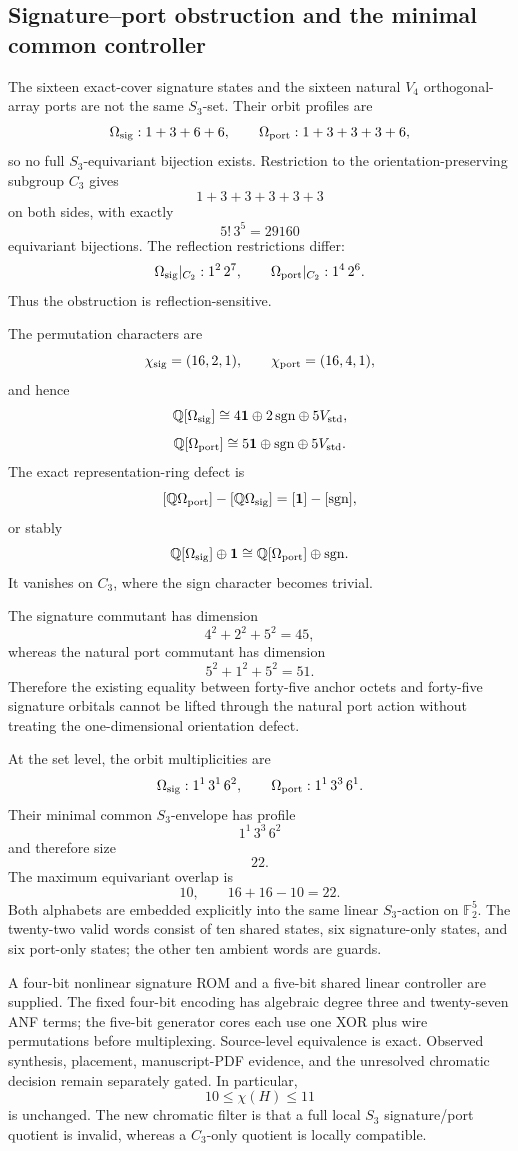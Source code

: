 \subsection{Signature--port obstruction and the minimal common controller}
The sixteen exact-cover signature states and the sixteen natural \(V_4\)
orthogonal-array ports are not the same \(S_3\)-set.  Their orbit profiles are
\[
\Omega_{\rm sig}:1+3+6+6,
\qquad
\Omega_{\rm port}:1+3+3+3+6,
\]
so no full \(S_3\)-equivariant bijection exists.  Restriction to the
orientation-preserving subgroup \(C_3\) gives
\[
1+3+3+3+3+3
\]
on both sides, with exactly
\[
5!\,3^5=29160
\]
equivariant bijections.  The reflection restrictions differ:
\[
\Omega_{\rm sig}|_{C_2}:1^2\,2^7,
\qquad
\Omega_{\rm port}|_{C_2}:1^4\,2^6.
\]
Thus the obstruction is reflection-sensitive.

The permutation characters are
\[
\chi_{\rm sig}=(16,2,1),
\qquad
\chi_{\rm port}=(16,4,1),
\]
and hence
\[
\mathbb Q[\Omega_{\rm sig}]
\cong4\mathbf1\oplus2\,\mathrm{sgn}\oplus5V_{\rm std},
\]
\[
\mathbb Q[\Omega_{\rm port}]
\cong5\mathbf1\oplus\mathrm{sgn}\oplus5V_{\rm std}.
\]
The exact representation-ring defect is
\[
[\mathbb Q\Omega_{\rm port}]-[\mathbb Q\Omega_{\rm sig}]
=[\mathbf1]-[\mathrm{sgn}],
\]
or stably
\[
\mathbb Q[\Omega_{\rm sig}]\oplus\mathbf1
\cong
\mathbb Q[\Omega_{\rm port}]\oplus\mathrm{sgn}.
\]
It vanishes on \(C_3\), where the sign character becomes trivial.

The signature commutant has dimension
\[
4^2+2^2+5^2=45,
\]
whereas the natural port commutant has dimension
\[
5^2+1^2+5^2=51.
\]
Therefore the existing equality between forty-five anchor octets and
forty-five signature orbitals cannot be lifted through the natural port
action without treating the one-dimensional orientation defect.

At the set level, the orbit multiplicities are
\[
\Omega_{\rm sig}:1^1\,3^1\,6^2,
\qquad
\Omega_{\rm port}:1^1\,3^3\,6^1.
\]
Their minimal common \(S_3\)-envelope has profile
\[
1^1\,3^3\,6^2
\]
and therefore size
\[
\boxed{22}.
\]
The maximum equivariant overlap is
\[
\boxed{10},
\qquad
16+16-10=22.
\]
Both alphabets are embedded explicitly into the same linear \(S_3\)-action
on \(\mathbb F_2^5\).  The twenty-two valid words consist of ten shared
states, six signature-only states, and six port-only states; the other ten
ambient words are guards.

A four-bit nonlinear signature ROM and a five-bit shared linear controller
are supplied.  The fixed four-bit encoding has algebraic degree three and
twenty-seven ANF terms; the five-bit generator cores each use one XOR plus
wire permutations before multiplexing.  Source-level equivalence is exact.
Observed synthesis, placement, manuscript-PDF evidence, and the unresolved
chromatic decision remain separately gated.  In particular,
\[
10\leq\chi(H)\leq11
\]
is unchanged.  The new chromatic filter is that a full local \(S_3\)
signature/port quotient is invalid, whereas a \(C_3\)-only quotient is
locally compatible.
